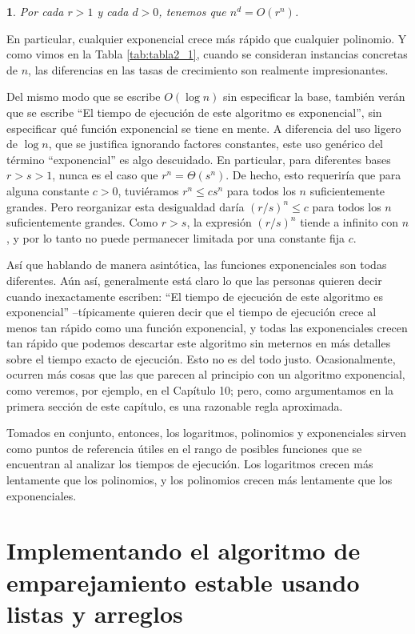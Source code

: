 \documentclass[a4paper, 12pt]{book}
\theoremstyle{dotless}
\newtheorem{theorem}{}[section]
\begin{document}
\begin{theorem}
Por cada $r>1$ y cada $d>0$, tenemos que $n^d=O(r^n)$.
\end{theorem} 

En particular, cualquier exponencial crece más rápido que cualquier polinomio. Y como vimos en la Tabla \ref{tab:tabla2_1}, cuando se consideran instancias concretas de $n$, las diferencias en las tasas de crecimiento son realmente impresionantes.

Del mismo modo que se escribe $O(\log n)$ sin especificar la base, también verán que se escribe ``El tiempo de ejecución de este algoritmo es exponencial'', sin especificar qué función exponencial se tiene en mente. A diferencia del uso ligero de $\log n$, que se justifica ignorando factores constantes, este uso genérico del término ``exponencial'' es algo descuidado. En particular, para diferentes bases $r> s > 1$, nunca es el caso que $r^n = \Theta(s^n)$. De hecho, esto requeriría que para alguna constante $c>0$, tuviéramos $r^n \leq cs^n$ para todos los $n$ suficientemente grandes. Pero reorganizar esta desigualdad daría $(r/s)^n \leq c$ para todos los $n$ suficientemente grandes. Como $r>s$, la expresión $(r/s)^n$ tiende a infinito con $n$, y por lo tanto no puede permanecer limitada por una constante fija $c$.

Así que hablando de manera asintótica, las funciones exponenciales son todas diferentes. Aún así, generalmente está claro lo que las personas quieren decir cuando inexactamente escriben: ``El tiempo de ejecución de este algoritmo es exponencial'' --típicamente quieren decir que el tiempo de ejecución crece al menos tan rápido como una función exponencial, y todas las exponenciales crecen tan rápido que podemos descartar este algoritmo sin meternos en más detalles sobre el tiempo exacto de ejecución. Esto no es del todo justo. Ocasionalmente, ocurren más cosas que las que parecen al principio con un algoritmo exponencial, como veremos, por ejemplo, en el Capítulo 10; pero, como argumentamos en la primera sección de este capítulo, es una razonable regla aproximada.

Tomados en conjunto, entonces, los logaritmos, polinomios y exponenciales sirven como puntos de referencia útiles en el rango de posibles funciones que se encuentran al analizar los tiempos de ejecución. Los logaritmos crecen más lentamente que los polinomios, y los polinomios crecen más lentamente que los exponenciales.

\section{Implementando el algoritmo de emparejamiento estable usando listas y arreglos}
\end{document}
